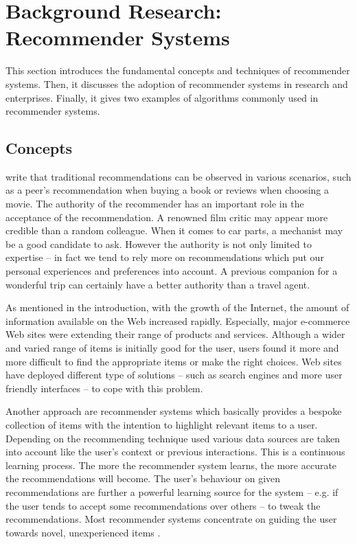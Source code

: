 \chapter{Background Research: Recommender Systems}

This section introduces the fundamental concepts and techniques of recommender systems. Then, it discusses the adoption of recommender systems in research and enterprises. Finally, it gives two examples of algorithms commonly used in recommender systems.

\section{Concepts}

\citet{ricci11} write that traditional recommendations can be observed in various scenarios, such as a peer's recommendation when buying a book or reviews when choosing a movie. The authority of the recommender has an important role in the acceptance of the recommendation. A renowned film critic may appear more credible than a random colleague. When it comes to car parts, a mechanist may be a good candidate to ask. However the authority is not only limited to expertise -- in fact we tend to rely more on recommendations which put our personal experiences and preferences into account. A previous companion for a wonderful trip can certainly have a better authority than a travel agent.

As mentioned in the introduction, with the growth of the Internet, the amount of information available on the Web increased rapidly. Especially, major e-commerce Web sites were extending their range of products and services. Although a wider and varied range of items is initially good for the user, users found it more and more difficult to find the appropriate items or make the right choices. Web sites have deployed different type of solutions -- such as search engines and more user friendly interfaces -- to cope with this problem.

Another approach are recommender systems which basically provides a bespoke collection of items with the intention to highlight relevant items to a user. Depending on the recommending technique used various data sources are taken into account like the user's context or previous interactions. This is a continuous learning process. The more the recommender system learns, the more accurate the recommendations will become. The user's behaviour on given recommendations are further a powerful learning source for the system -- e.g. if the user tends to accept some recommendations over others -- to tweak the recommendations. Most recommender systems concentrate on guiding the user towards novel, unexperienced items \cite{herlocker04}.



